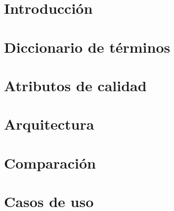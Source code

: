 \documentclass[10pt, a4paper]{article}
\begin{document}
\maketitle
\tableofcontents
\newpage

\section{Introducción}

	

\section{Diccionario de términos}

	

\section{Atributos de calidad}
	\label{sec:calidad}

	

\section{Arquitectura}
	\label{sec:arquitectura}



\section{Comparación}
	\label{sec:comparacion}

	

\section{Casos de uso}
	\label{sec:cu}

	
\end{document}
